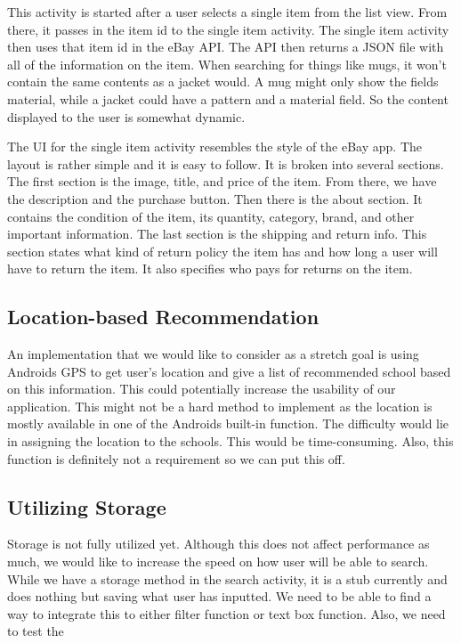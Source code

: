 \documentclass[journal,compsoc, 10pt, draftclsnofoot, onecolumn]{IEEEtran}
\begin{document}
This activity is started after a user selects a single item from the list view. From 
there, it passes in the item id to the single item activity. The single item 
activity then uses that item id in the eBay API. The API then returns a JSON file 
with all of the information on the item. When searching for things like mugs, it 
won't contain the same contents as a jacket would. A mug might only show the 
fields material, while a jacket could have a pattern and a material field. 
So the content displayed to the user is somewhat dynamic. \newline

The UI for the single item activity resembles the style of the eBay app.  The layout is rather 
simple and it is easy to follow. It is broken into several sections. The first 
section is the image, title, and price of the item. From there, we have the 
description and the purchase button. Then there is the about section. It contains 
the condition of the item, its quantity, category, brand, and other important 
information. The last section is the shipping and return info. This section states 
what kind of return policy the item has and how long a user will have to return the 
item. It also specifies who pays for returns on the item.\newline

\subsection{Location-based Recommendation}
An implementation that we would like to consider as a stretch goal is using 
Androids GPS to get user's location and give a list of recommended school 
based on this information. This could potentially increase the usability of our 
application. This might not be a hard method to implement as the location is 
mostly available in one of the Androids built-in function. The difficulty would 
lie in assigning the location to the schools. This would be time-consuming. 
Also, this function is definitely not a requirement so we can put this off.

\subsection{Utilizing Storage}
Storage is not fully utilized yet. Although this does not affect performance as 
much, we would like to increase the speed on how user will be able to search. 
While we have a storage method in the search activity, it is a stub currently 
and does nothing but saving what user has inputted. We need to be able to 
find a way to integrate this to either filter function or text box function. Also,
 we need to test the 
\end{document}
